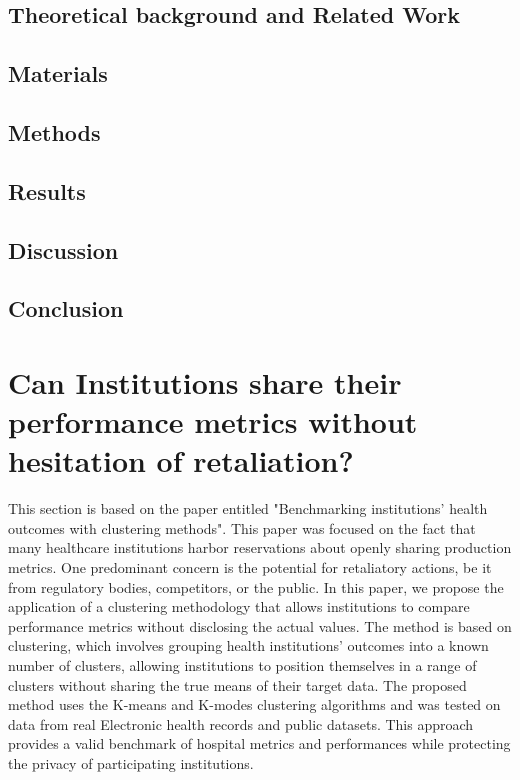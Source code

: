 \subsection{Theoretical background and Related Work}

\subsection{Materials}

\subsection{Methods}

\subsection{Results}

\subsection{Discussion}

\subsection{Conclusion}



\section{Can Institutions share their performance metrics without hesitation of retaliation?}\label{subsec:benchmark}
This section is based on the paper entitled "Benchmarking institutions' health outcomes with clustering methods". This paper was focused on the fact that many healthcare institutions harbor reservations about openly sharing production metrics. One predominant concern is the potential for retaliatory actions, be it from regulatory bodies, competitors, or the public. In this paper, we propose the application of a clustering methodology that allows institutions to compare performance metrics without disclosing the actual values. The method is based on clustering, which involves grouping health institutions' outcomes into a known number of clusters, allowing institutions to position themselves in a range of clusters without sharing the true means of their target data. The proposed method uses the K-means and K-modes clustering algorithms and was tested on data from real Electronic health records and public datasets. This approach provides a valid benchmark of hospital metrics and performances while protecting the privacy of participating institutions. 
